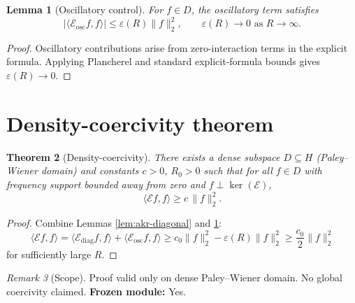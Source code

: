 \documentclass[11pt]{article}
\theoremstyle{plain}
\newtheorem{theorem}{Theorem}
\newtheorem{lemma}[theorem]{Lemma}
\theoremstyle{definition}
\theoremstyle{remark}
\newtheorem{remark}[theorem]{Remark}
\newcommand{\cE}{\mathcal{E}}
\begin{document}
\begin{lemma}[Oscillatory control]\label{lem:akr-oscillatory}
For $f\in D$, the oscillatory term satisfies
\[
|\langle \cE_{\mathrm{osc}} f,f\rangle| \le \varepsilon(R)\|f\|_2^2,
\qquad \varepsilon(R)\to 0 \text{ as } R\to\infty.
\]
\end{lemma}

\begin{proof}
Oscillatory contributions arise from zero-interaction terms in the explicit formula.  
Applying Plancherel and standard explicit-formula bounds gives $\varepsilon(R)\to 0$.  

\end{proof}

\section{Density-coercivity theorem}

\begin{theorem}[Density-coercivity]\label{thm:akr-density}
There exists a dense subspace $D\subseteq H$ (Paley--Wiener domain) and constants $c>0$, $R_0>0$ such that for all $f\in D$ with frequency support bounded away from zero and $f\perp \ker(\cE)$,
\[
\langle \cE f,f\rangle \ge c\,\|f\|_2^2.
\]
\end{theorem}

\begin{proof}
Combine Lemmas \ref{lem:akr-diagonal} and \ref{lem:akr-oscillatory}:  
\[
\langle \cE f,f\rangle
=
\langle \cE_{\mathrm{diag}} f,f\rangle + \langle \cE_{\mathrm{osc}} f,f\rangle
\ge c_0 \|f\|_2^2 - \varepsilon(R)\|f\|_2^2
\ge \frac{c_0}{2} \|f\|_2^2
\]
for sufficiently large $R$.  

\end{proof}

\begin{remark}[Scope]
Proof valid only on dense Paley--Wiener domain. No global coercivity claimed.  
\textbf{Frozen module:} Yes.
\end{remark}
\end{document}

